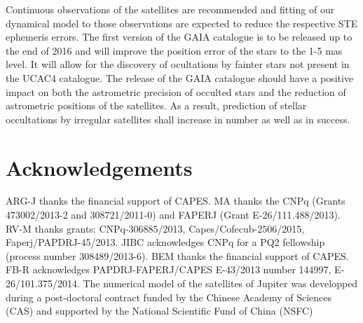 \documentclass[useAMS,usenatbib]{mn2e}
\begin{document}
Continuous observations of the satellites are recommended and fitting of our dynamical model to those observations are expected to reduce the respective STE ephemeris errors. The first version of the GAIA catalogue is to be released up to the end of 2016 and will improve the position error of the stars to the 1-5 mas level. It will allow for the discovery of ocultations by fainter stars not present in the UCAC4 catalogue.
The release of the GAIA catalogue should have a positive impact on both the astrometric precision of occulted stars and the reduction of astrometric positions of the satellites. As a result, prediction of stellar occultations by irregular satellites shall increase in number as well as in success.

\section*{Acknowledgements}

ARG-J thanks the financial support of CAPES.
MA thanks the CNPq (Grants 473002/2013-2 and 308721/2011-0) and FAPERJ (Grant E-26/111.488/2013).
RV-M thanks grants: CNPq-306885/2013, Capes/Cofecub-2506/2015, Faperj/PAPDRJ-45/2013.
JIBC acknowledges CNPq for a PQ2 fellowship (process number 308489/2013-6).
BEM thanks the financial support of CAPES.
FB-R acknowledges PAPDRJ-FAPERJ/CAPES E-43/2013 number 144997, E-26/101.375/2014.
The numerical model of the satellites of Jupiter was developped during a post-doctoral contract funded by the Chinese Academy of Sciences (CAS) and supported by the National Scientific Fund of China (NSFC)






\label{lastpage}
\end{document}
